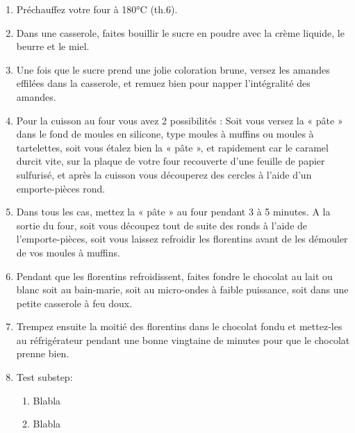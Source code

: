 \begin{recipe}

\begin{enumerate}
\item{Préchauffez votre four à 180°C (th.6).}
\item{Dans une casserole, faites bouillir le sucre en poudre avec la crème liquide, le beurre et le miel.}
\item{Une fois que le sucre prend une jolie coloration brune, versez les amandes effilées dans la casserole, et remuez bien pour napper l’intégralité des amandes.}	
\item{Pour la cuisson au four vous avez 2 possibilités : Soit vous versez la « pâte » dans le fond de moules en silicone, type moules à muffins ou moules à tartelettes, soit vous étalez bien la « pâte », et rapidement car le caramel durcit vite, sur la plaque de votre four recouverte d’une feuille de papier sulfurisé, et après la cuisson vous découperez des cercles à l’aide d’un emporte-pièces rond.}
\item{Dans tous les cas, mettez la « pâte » au four pendant 3 à 5 minutes. A la sortie du four, soit vous découpez tout de suite des ronds à l’aide de l’emporte-pièces, soit vous laissez refroidir les florentins avant de les démouler de vos moules à muffins.}
\item{Pendant que les florentins refroidissent, faites fondre le chocolat au lait ou blanc soit au bain-marie, soit au micro-ondes à faible puissance, soit dans une petite casserole à feu doux.}
\item{Trempez ensuite la moitié des florentins dans le chocolat fondu et mettez-les au réfrigérateur pendant une bonne vingtaine de minutes pour que le chocolat prenne bien.}
\item{Test substep}:
\begin{enumerate}
\item{Blabla}
\item{Blabla}
\end{enumerate}

\end{enumerate}

\end{recipe}

\begin{notes}

\end{notes}	
\clearpage